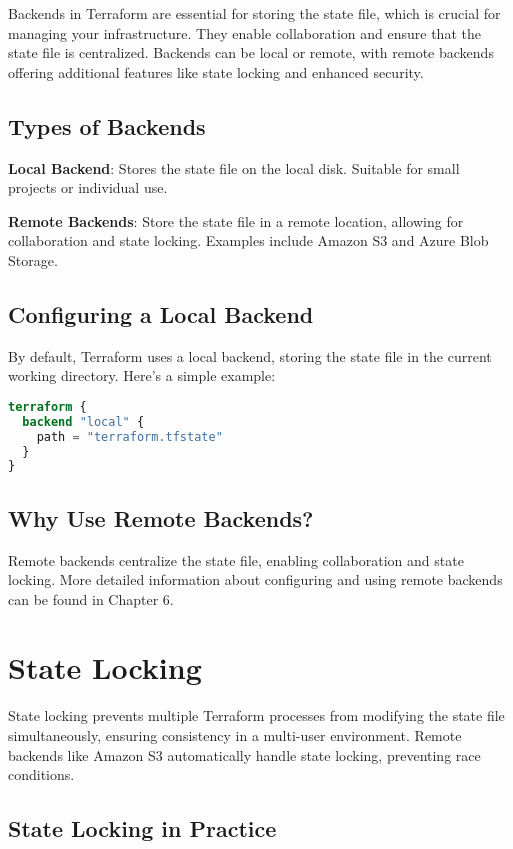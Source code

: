 Backends in Terraform are essential for storing the state file, which is crucial for managing your infrastructure. They enable collaboration and ensure that the state file is centralized. Backends can be local or remote, with remote backends offering additional features like state locking and enhanced security.

\subsection{Types of Backends}

\textbf{Local Backend}: Stores the state file on the local disk. Suitable for small projects or individual use.

\textbf{Remote Backends}: Store the state file in a remote location, allowing for collaboration and state locking. Examples include Amazon S3 and Azure Blob Storage.

\subsection{Configuring a Local Backend}

By default, Terraform uses a local backend, storing the state file in the current working directory. Here's a simple example:

\begin{lstlisting}[language=terraform]
terraform {
  backend "local" {
    path = "terraform.tfstate"
  }
}
\end{lstlisting}

\subsection{Why Use Remote Backends?}

Remote backends centralize the state file, enabling collaboration and state locking. More detailed information about configuring and using remote backends can be found in Chapter 6.

\section{State Locking}

State locking prevents multiple Terraform processes from modifying the state file simultaneously, ensuring consistency in a multi-user environment. Remote backends like Amazon S3 automatically handle state locking, preventing race conditions.

\subsection{State Locking in Practice}

